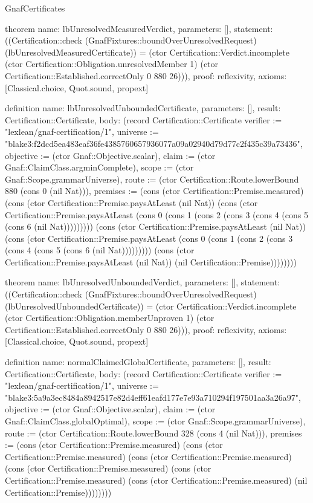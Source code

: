 \begin{lexlean}{GnafCertificates}
\begin{semanticmodule}
theorem{
  name: lbUnresolvedMeasuredVerdict,
  parameters: [],
  statement: ((Certification::check (GnafFixtures::boundOverUnresolvedRequest) (lbUnresolvedMeasuredCertificate)) = (ctor Certification::Verdict.incomplete (ctor Certification::Obligation.unresolvedMember 1) (ctor Certification::Established.correctOnly 0 880 26))),
  proof: reflexivity{},
  axioms: [Classical.choice, Quot.sound, propext]
}

definition{
  name: lbUnresolvedUnboundedCertificate,
  parameters: [],
  result: Certification::Certificate,
  body: (record Certification::Certificate {verifier := "lexlean/gnaf-certification/1", universe := "blake3:f2dcd5ea483eaf36fe4385760657936077a09a02940d79d77c2f435c39a73436", objective := (ctor Gnaf::Objective.scalar), claim := (ctor Gnaf::ClaimClass.argminComplete), scope := (ctor Gnaf::Scope.grammarUniverse), route := (ctor Certification::Route.lowerBound 880 (cons 0 (nil Nat))), premises := (cons (ctor Certification::Premise.measured) (cons (ctor Certification::Premise.paysAtLeast (nil Nat)) (cons (ctor Certification::Premise.paysAtLeast (cons 0 (cons 1 (cons 2 (cons 3 (cons 4 (cons 5 (cons 6 (nil Nat))))))))) (cons (ctor Certification::Premise.paysAtLeast (nil Nat)) (cons (ctor Certification::Premise.paysAtLeast (cons 0 (cons 1 (cons 2 (cons 3 (cons 4 (cons 5 (cons 6 (nil Nat))))))))) (cons (ctor Certification::Premise.paysAtLeast (nil Nat)) (nil Certification::Premise)))))))})
}

theorem{
  name: lbUnresolvedUnboundedVerdict,
  parameters: [],
  statement: ((Certification::check (GnafFixtures::boundOverUnresolvedRequest) (lbUnresolvedUnboundedCertificate)) = (ctor Certification::Verdict.incomplete (ctor Certification::Obligation.memberUnproven 1) (ctor Certification::Established.correctOnly 0 880 26))),
  proof: reflexivity{},
  axioms: [Classical.choice, Quot.sound, propext]
}

definition{
  name: normalClaimedGlobalCertificate,
  parameters: [],
  result: Certification::Certificate,
  body: (record Certification::Certificate {verifier := "lexlean/gnaf-certification/1", universe := "blake3:5a9a3ec8484a8942517e82d4eff61eafd177e7e93a710294f197501aa3a26a97", objective := (ctor Gnaf::Objective.scalar), claim := (ctor Gnaf::ClaimClass.globalOptimal), scope := (ctor Gnaf::Scope.grammarUniverse), route := (ctor Certification::Route.lowerBound 328 (cons 4 (nil Nat))), premises := (cons (ctor Certification::Premise.measured) (cons (ctor Certification::Premise.measured) (cons (ctor Certification::Premise.measured) (cons (ctor Certification::Premise.measured) (cons (ctor Certification::Premise.measured) (cons (ctor Certification::Premise.measured) (nil Certification::Premise)))))))})
}


\end{semanticmodule}
\end{lexlean}
